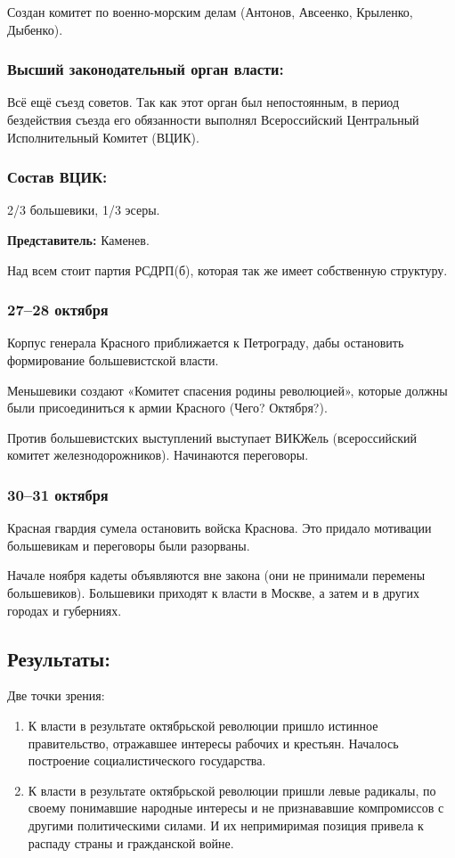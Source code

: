 Создан комитет по военно-морским делам (Антонов, Авсеенко, Крыленко, Дыбенко).

\subsubsection{\textbf{Высший законодательный орган власти:}}

Всё ещё съезд советов.
Так как этот орган был непостоянным, в период бездействия съезда его обязанности выполнял Всероссийский Центральный Исполнительный Комитет (ВЦИК).

\subsubsection{\textbf{Состав ВЦИК:}}

2/3 большевики, 1/3 эсеры.

\textbf{Представитель:} Каменев.

Над всем стоит партия РСДРП(б), которая так же имеет собственную структуру.

\subsubsection{\textbf{27--28 октября}}

Корпус генерала Красного приближается к Петрограду, дабы остановить формирование большевистской власти.

Меньшевики создают «Комитет спасения родины революцией», которые должны были присоединиться к армии Красного (Чего? Октября?).

Против большевистских выступлений выступает ВИКЖель (всероссийский комитет железнодорожников). Начинаются переговоры.

\subsubsection{\textbf{30--31 октября}}


Красная гвардия сумела остановить войска Краснова. Это придало мотивации большевикам и переговоры были разорваны.

Начале ноября кадеты объявляются вне закона (они не принимали перемены большевиков). Большевики приходят к власти в Москве, а затем и в других городах и губерниях.

\subsection{Результаты:}

Две точки зрения:

\begin{enumerate}
    \item К власти в результате октябрьской революции пришло истинное правительство, отражавшее интересы рабочих и крестьян. Началось построение социалистического государства.
    \item К власти в результате октябрьской революции пришли левые радикалы, по своему понимавшие народные интересы и не признававшие компромиссов с другими политическими силами. И их непримиримая позиция привела к распаду страны и гражданской войне.
\end{enumerate}